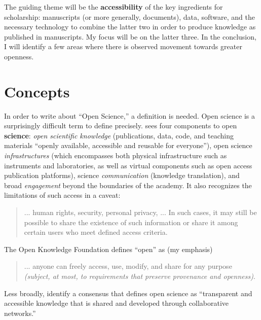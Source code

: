 \documentclass{article}
\begin{document}
The guiding theme will be the \textbf{accessibility} of the key ingredients for scholarship: manuscripts (or more generally, documents), data, software, and the necessary technology to combine the latter two in order to produce knowledge as published in manuscripts. My focus will be on the latter three. 
In the conclusion, I will identify a few areas where there is observed movement towards greater openness. 


\section{Concepts}

In order to write about ``Open Science,'' a definition is needed. Open science is a surprisingly difficult term to define precisely. 
%
\citet{unesco_understanding_2022} sees four components to open \textbf{science}: \textit{open   scientific   knowledge }(publications, data, code, and teaching materials ``openly    available, accessible and reusable for everyone''),     open     science     \textit{infrastructures} (which encompasses both physical infrastructure such as instruments and laboratories, as well as virtual components such as open access publication platforms),     science     \textit{communication} (knowledge translation),  and broad \textit{engagement} beyond the boundaries of the academy. It also recognizes the limitations of such access in a caveat: 

\begin{quote}

...  human rights, security, personal privacy, ... In such  cases,  it  may  still  be  possible  to  share  the  existence  of  such  information or share it among certain users who meet defined access criteria.
    
\end{quote}

The Open Knowledge Foundation \parencite{open_knowledge_foundation_defining_2024} defines ``open'' as (my emphasis)

\begin{quote}

    ... anyone can freely access, use, modify, and share for any purpose \textit{(subject, at most, to requirements that preserve provenance and openness)}.
    
\end{quote}

Less broadly, \cite{vicente-saez_open_2018} identify a consensus that defines open science as ``transparent and accessible knowledge that is shared and developed through collaborative networks.''
\end{document}
